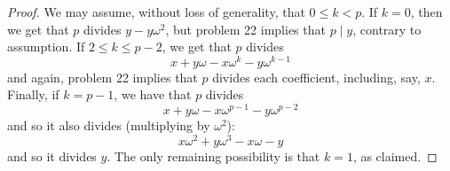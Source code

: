 \begin{proof}
    We may assume, without loss of generality, that $0 \leq k < p$. If $k=0$, then we get that $p$ divides $y - y\omega^2$, but problem 22 implies that $p \mid y$, contrary to assumption. If $2 \leq k \leq p-2$, we get that $p$ divides
    \[ x + y\omega - x\omega^k - y\omega^{k-1} \]
    and again, problem 22 implies that $p$ divides each coefficient, including, say, $x$. Finally, if $k=p-1$, we have that $p$ divides
    \[ x+y\omega-x\omega^{p-1}-y\omega^{p-2} \]
    and so it also divides (multiplying by $\omega^2$):
    \[ x\omega^2+y\omega^3-x\omega-y \]
    and so it divides $y$. The only remaining possibility is that $k=1$, as claimed.
\end{proof}